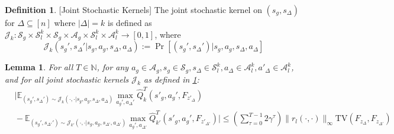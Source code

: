 \documentclass{article}
\theoremstyle{plain}
\newtheorem{lemma}[theorem]{Lemma}
\theoremstyle{definition}
\newtheorem{definition}[theorem]{Definition}
\def\E{\mathbb{E}}
\def\N{\mathbb{N}}
\begin{document}
\begin{definition}\label{definition: joint_transition_probability}[Joint Stochastic Kernels] The joint stochastic kernel on $(s_g,s_\Delta)$ for $\Delta\subseteq [n]$ where $|\Delta|=k$ is defined as $\mathcal{J}_k:\mathcal{S}_g\times\mathcal{S}_l^{k}\times\mathcal{S}_g\times\mathcal{A}_g\times\mathcal{S}_l^{k}\times\mathcal{A}_l^k\to[0,1]$, where \begin{equation}\mathcal{J}_k(s_g',s_\Delta'|s_g, a_g, s_\Delta, a_\Delta) := \Pr[(s_g',s_\Delta')|s_g, a_g, s_\Delta,a_\Delta]\end{equation}
\end{definition}
\begin{lemma} For all $T\in\N$, for any $a_g\in\mathcal{A}_g,s_g\in\mathcal{S}_g, s_\Delta\in\mathcal{S}_l^{k}, a_\Delta \in \mathcal{A}_l^k, a'_\Delta \in \mathcal{A}_l^k$, and for all joint stochastic kernels $\mathcal{J}_k$ as defined in \cref{definition: joint_transition_probability}:\label{lemma: expectation Q lipschitz continuous wrt Fsdelta}
\begin{align*}
&\bigg|\E_{(s_g',s_\Delta')\sim\mathcal{J}_k(\cdot,\cdot|s_g,a_g,s_\Delta,a_\Delta)}\max_{a_g',a_\Delta'}\hat{Q}_k^T(s'_g,a_g',F_{z'_\Delta}) \\
&\!-\!\E_{(s_g',s_{\Delta'}')\sim\mathcal{J}_{k'}(\cdot,\cdot|s_g,a_g,s_{\Delta'},a_{\Delta'})}\max_{a_g',a_{\Delta'}}\hat{Q}_{k'}^T(s'_g, a_g', F_{z'_{\Delta'}})\bigg|\!\leq\!\left(\sum_{\tau=0}^{T-1}2\gamma^\tau\right)\!\|r_l(\cdot,\cdot)\|_\infty\mathrm{TV}\left(F_{z_\Delta}, F_{z_{\Delta'}}\right)
\end{align*}
\end{lemma}
\end{document}
